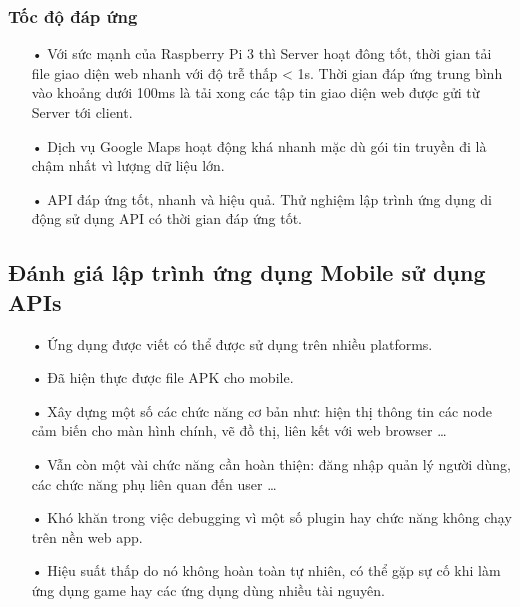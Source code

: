 \subsubsection*{Tốc độ đáp ứng}
\begin{itemize}
	\item[•] Với sức mạnh của Raspberry Pi 3 thì Server hoạt đông tốt, thời gian tải file giao diện web nhanh với độ trễ thấp < 1s. Thời gian đáp ứng trung bình vào khoảng dưới 100ms là tải xong các tập tin giao diện web được gửi từ Server tới client.
	\item[•] Dịch vụ Google Maps hoạt động khá nhanh mặc dù gói tin truyền đi là chậm nhất vì lượng dữ liệu lớn.
	\item[•] API đáp ứng tốt, nhanh và hiệu quả. Thử nghiệm lập trình ứng dụng di động sử dụng API có thời gian đáp ứng tốt.
\end{itemize}

\subsection{Đánh giá lập trình ứng dụng Mobile sử dụng APIs}
\begin{itemize}
\item[•]Ứng dụng được viết có thể được sử dụng trên nhiều platforms.
\item[•]Đã hiện thực được file APK cho mobile.
\item[•]Xây dựng một số các chức năng cơ bản như: hiện thị thông tin các node cảm biến cho màn hình chính, vẽ đồ thị, liên kết với web browser …
\item[•] Vẫn còn một vài chức năng cần hoàn thiện: đăng nhập quản lý người dùng, các chức năng phụ liên quan đến user …
\item[•] Khó khăn trong việc debugging vì một số plugin hay chức năng không chạy trên nền web app. 
\item[•]Hiệu suất thấp do nó không hoàn toàn tự nhiên, có thể gặp sự cố khi làm ứng dụng game hay các ứng dụng dùng nhiều tài nguyên.

\end{itemize}